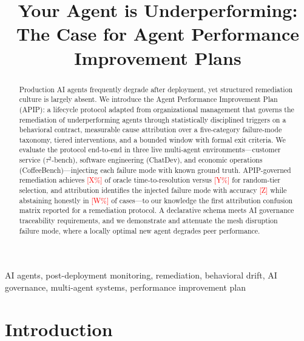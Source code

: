 \documentclass[conference]{IEEEtran}
\newcommand{\ph}[1]{\textcolor{red}{[#1]}}
\begin{document}
\title{Your Agent is Underperforming:\\
The Case for Agent Performance Improvement Plans}

\author{
}

\maketitle

\begin{abstract}
Production AI agents frequently degrade after deployment, yet structured
remediation culture is largely absent. We introduce the Agent Performance
Improvement Plan (APIP): a lifecycle protocol adapted from organizational
management that governs the remediation of underperforming agents through
statistically disciplined triggers on a behavioral contract, measurable cause
attribution over a five-category failure-mode taxonomy, tiered interventions,
and a bounded window with formal exit criteria. We evaluate the protocol
end-to-end in three live multi-agent environments---customer service
($\tau^2$-bench), software engineering (ChatDev), and economic operations
(CoffeeBench)---injecting each failure mode with known ground truth. APIP-governed remediation achieves \ph{X\%} of oracle
time-to-resolution versus \ph{Y\%} for random-tier selection, and attribution
identifies the injected failure mode with accuracy \ph{Z} while abstaining
honestly in \ph{W\%} of cases---to our knowledge the first attribution confusion
matrix reported for a remediation protocol. A declarative schema meets AI
governance traceability requirements, and we demonstrate and attenuate the mesh
disruption failure mode, where a locally optimal new agent degrades peer
performance.
\end{abstract}

\begin{IEEEkeywords}
AI agents, post-deployment monitoring, remediation, behavioral drift, AI
governance, multi-agent systems, performance improvement plan
\end{IEEEkeywords}

\section{Introduction}
\end{document}
